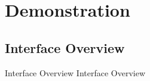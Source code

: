 \section{Demonstration}

\subsection{Interface Overview}

\begin{frame}{Interface Overview}
  Interface Overview
\end{frame}
